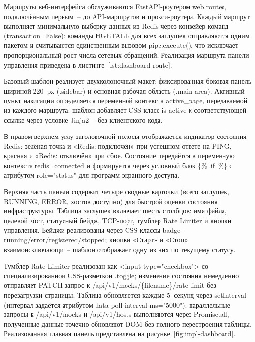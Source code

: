 Маршруты веб-интерфейса обслуживаются FastAPI-роутером web.routes, подключённым первым~-- до API-маршрутов и прокси-роутера. Каждый маршрут выполняет минимальную выборку данных из Redis через конвейер команд (transaction=False): команды HGETALL для всех заглушек отправляются одним пакетом и считываются единственным вызовом pipe.execute(), что исключает пропорциональный рост числа сетевых обращений. Реализация маршрута панели управления приведена в листинге~\ref{lst:dashboard-route}.



Базовый шаблон реализует двухколоночный макет: фиксированная боковая панель шириной 220~px (.sidebar) и основная рабочая область (.main-area). Активный пункт навигации определяется переменной контекста active\_page, передаваемой из каждого маршрута: шаблон добавляет CSS-класс is-active к соответствующей ссылке через условие Jinja2~-- без клиентского кода.

В правом верхнем углу заголовочной полосы отображается индикатор состояния Redis: зелёная точка и «Redis: подключён» при успешном ответе на PING, красная и «Redis: отключён» при сбое. Состояние передаётся в переменную контекста redis\_connected и формируется через условный блок \{\%~if~\%\} с атрибутом role="status" для программ экранного доступа.


Верхняя часть панели содержит четыре сводные карточки (всего заглушек, RUNNING, ERROR, хостов доступно) для быстрой оценки состояния инфраструктуры. Таблица заглушек включает шесть столбцов: имя файла, целевой хост, статусный бейдж, TCP-порт, тумблер Rate Limiter и кнопки управления. Бейджи реализованы через CSS-классы badge{-}{-}running/error/registered/stopped; кнопки «Старт» и «Стоп» взаимоисключающи~-- шаблон отображает одну из них по текущему статусу.

Тумблер Rate Limiter реализован как <input type="checkbox"{}> со специализированной CSS-разметкой .toggle; изменение состояния немедленно отправляет PATCH-запрос к /api/v1/mocks/\{filename\}/rate-limit без перезагрузки страницы. Таблица обновляется каждые 5~секунд через setInterval (интервал задаётся атрибутом data-poll-interval-ms="5000"): параллельные запросы к /api/v1/mocks и /api/v1/hosts выполняются через Promise.all, полученные данные точечно обновляют DOM без полного перестроения таблицы. Реализованная главная панель представлена на рисунке~\ref{fig:impl-dashboard}.


